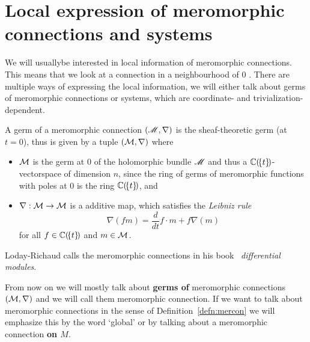 \section{Local expression of meromorphic connections and systems}
We will usually\TODO[only?] be interested in local information of meromorphic
connections.  This means that we look at a connection in a neighbourhood of $0$
.
There are multiple ways of expressing the local information, we will either
talk about germs of meromorphic connections or systems, which are coordinate-
and trivialization-dependent.
\begin{prop}
  A germ of a meromorphic connection $(\mathscr{M},\nabla)$ is the sheaf-theoretic
  germ (at $t=0$), thus is given by a tuple $(\mathcal{M},\nabla)$ where
  \begin{itemize}
    \item $\mathcal{M}$ is the germ at $0$ of the holomorphic bundle $\mathscr{M}$ and thus a
      $\mathbb{C}(\!\{t\}\!)$-vectorspace of dimension $n$, since the ring of germs of
      meromorphic functions with poles at $0$ is the ring $\mathbb{C}(\!\{t\}\!)$, and
    \item $\nabla:\mathcal{M}\to \mathcal{M}$ is a additive map, which
      satisfies the \emph{Leibniz rule}
      \[
        \nabla(fm)=\frac{d}{dt} f\cdot m + f\nabla(m)
      \]
      for all $f\in\mathbb{C}(\!\{t\}\!)$ and $m\in \mathcal{M}$.
  \end{itemize}
  \begin{comment}
      \begin{s-rem}
      \marginnote{\cite{sabbah2007isomonodromic}}
      It is a $(\C(\!\{t\}\!),\nabla)$-vectorspace.
    \end{s-rem}
  \end{comment}
  \begin{s-rem}
    Loday-Richaud calls the meromorphic connections in his
    book~\cite[Def.4.2.1]{Loday2014} \emph{differential modules}.
  \end{s-rem}
\end{prop}
\begin{rem}\label{rem:GlobalNothingGerm}
  From now on we will mostly talk about \textbf{germs of} meromorphic
  connections $(\mathcal{M},\nabla)$ and we will call them meromorphic connection. If
  we want to talk about meromorphic connections in the sense of
  Definition~\ref{defn:mercon} we will emphasize this by the word `global' or
  by talking about a meromorphic connection \textbf{on $M$}.
\end{rem}
